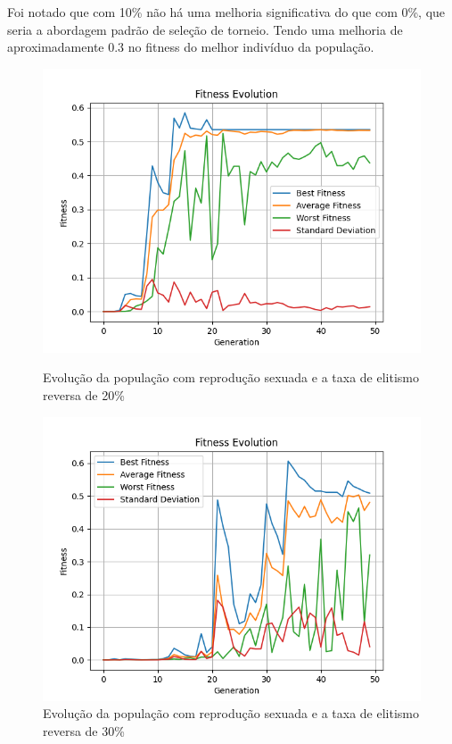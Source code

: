 \documentclass[12pt]{article}
\begin{document}
Foi notado que com 10\% não há uma melhoria significativa do que com 0\%, que seria a abordagem padrão de seleção de torneio. Tendo uma melhoria de aproximadamente 0.3 no fitness do melhor indivíduo da população.

\begin{figure}[h]
    \centering
    \begin{minipage}{0.5\textwidth}
        \centering
        \includegraphics[width=\linewidth]{figures/sexuado/rev_ev_20.png}
        \caption{Evolução da população com reprodução sexuada e a taxa de elitismo reversa de 20\%}
        \label{fig:fifth-reverse_elitism_sex_20}
    \end{minipage}\hfill
    \begin{minipage}{0.5\textwidth}
        \centering
        \includegraphics[width=\linewidth]{figures/sexuado/rev_el_30.png}
        \caption{Evolução da população com reprodução sexuada e a taxa de elitismo reversa de 30\%}
        \label{fig:reverse_elitism_sex_30}
    \end{minipage}
\end{figure}
\end{document}
